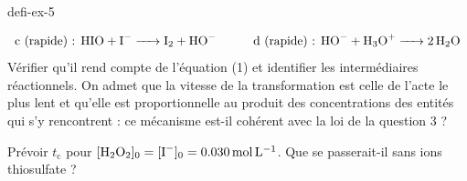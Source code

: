 \begin{blocEdition}{defi-ex-5}
\begin{questions}
\[\begin{array}{ll}
\text{c (rapide) : }\ce{HIO + I- -> I2 + HO-}\qquad&\text{d (rapide) : }\ce{HO- + H3O+ -> 2 H2O}\end{array}\]
Vérifier qu'il rend compte de l'équation (1) et identifier les intermédiaires réactionnels. On admet que la vitesse
de la transformation est celle de l'acte le plus lent et qu'elle est proportionnelle au produit des concentrations
des entités qui s'y rencontrent : ce mécanisme est-il cohérent avec la loi de la question 3 ?
\item Prévoir $t_\mathrm{c}$ pour $[\ce{H2O2}]_0=[\ce{I-}]_0=\qty{0,030}{mol.L^{-1}}$. Que se passerait-il sans ions
thiosulfate ?
\end{questions}
\end{blocEdition}

